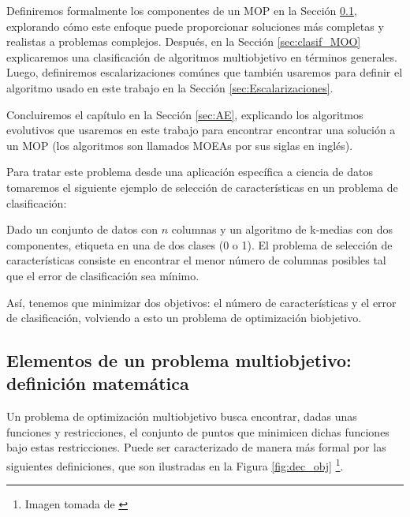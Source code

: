 Definiremos formalmente los componentes de un MOP en la Sección \ref{sec:Dominancia_Pareto}, explorando cómo este enfoque puede proporcionar soluciones más completas y realistas a problemas complejos. Después, en la Sección \ref{sec:clasif_MOO} explicaremos una clasificación de algoritmos multiobjetivo en términos generales. Luego, definiremos escalarizaciones comúnes que también usaremos para definir el algoritmo usado en este trabajo en la Sección \ref{sec:Escalarizaciones}.

Concluiremos el capítulo en la Sección \ref{sec:AE}, explicando los algoritmos evolutivos que usaremos en este trabajo para encontrar encontrar una solución a un MOP (los algoritmos son llamados MOEAs por sus siglas en inglés). 

Para tratar este problema desde una aplicación específica a ciencia de datos tomaremos el siguiente ejemplo de selección de características en un problema de clasificación:

\begin{texample} \label{ex:Selecc}
    Dado un conjunto de datos con $n$ columnas y un algoritmo de k-medias con dos componentes, etiqueta en una de dos clases (0 o 1). El problema de selección de características consiste en encontrar el menor número de columnas posibles tal que el error de clasificación sea mínimo.
    
    Así, tenemos que minimizar dos objetivos: el número de características y el error de clasificación, volviendo a esto un problema de optimización biobjetivo. 
\end{texample}


\subsection{Elementos de un problema multiobjetivo: definición matemática} \label{sec:Dominancia_Pareto}

Un problema de optimización multiobjetivo busca encontrar, dadas unas funciones y restricciones, el conjunto de puntos que minimicen dichas funciones bajo estas restricciones. Puede ser caracterizado de manera más formal por las siguientes definiciones, que son ilustradas en la Figura \ref{fig:dec_obj}  \footnote{Imagen tomada de \cite{coelloEvolutionaryAlgorithmsSolving}}. 

